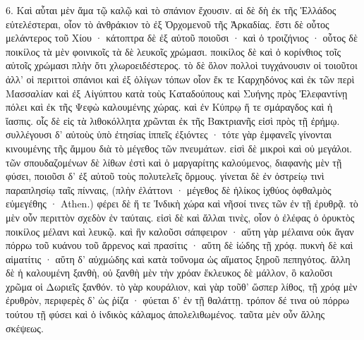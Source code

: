 \documentclass[a4paper, 11pt, oneside, polutonikogreek, german]{article}
\begin{document}
6. Καὶ αὗται μὲν ἅμα τῷ καλῷ καὶ τὸ σπάνιον ἔχουσιν. αἱ δὲ δὴ ἐκ τῆς Ἑλλάδος εὐτελέστεραι, οἷον τὸ ἀνθράκιον τὸ ἐξ Ὀρχομενοῦ τῆς Ἀρκαδίας. ἔστι δὲ οὗτος μελάντερος τοῦ Χίου · κάτοπτρα δὲ ἐξ αὐτοῦ ποιοῦσι · καὶ ὁ τροιζήνιος · οὗτος δὲ ποικίλος τὰ μὲν φοινικοῖς τὰ δὲ λευκοῖς χρώμασι. ποικίλος δὲ καὶ ὁ κορίνθιος τοῖς αὐτοῖς χρώμασι πλὴν ὅτι χλωροειδέστερος. τὸ δὲ ὅλον πολλοὶ τυγχάνουσιν οἱ τοιοῦτοι ἀλλ' οἱ περιττοὶ σπάνιοι καὶ ἐξ ὀλίγων τόπων οἷον ἔκ τε Καρχηδόνος καὶ ἐκ τῶν περὶ Μασσαλίαν καὶ ἐξ Αἰγύπτου κατὰ τοὺς Καταδούπους καὶ Συήνης πρὸς Ἐλεφαντίνῃ πόλει καὶ ἐκ τῆς Ψεφὼ καλουμένης χώρας. καὶ ἐν Κύπρῳ ἥ τε σμάραγδος καὶ ἡ ἴασπις. οἷς δὲ εἰς τὰ λιθοκόλλητα χρῶνται ἐκ τῆς Βακτριανῆς εἰσὶ πρὸς τῇ ἐρήμῳ. συλλέγουσι δ' αὐτοὺς ὑπὸ ἐτησίας ἱππεῖς ἐξιόντες · τότε γὰρ ἐμφανεῖς γίνονται κινουμένης τῆς ἄμμου διὰ τὸ μέγεθος τῶν πνευμάτων. εἰσὶ δὲ μικροὶ καὶ οὐ μεγάλοι. τῶν σπουδαζομένων δὲ λίθων ἐστὶ καὶ ὁ μαργαρίτης καλούμενος, διαφανὴς μὲν τῇ φύσει, ποιοῦσι δ' ἐξ αὐτοῦ τοὺς πολυτελεῖς ὅρμους. γίνεται δὲ ἐν ὀστρείῳ τινὶ παραπλησίῳ ταῖς πίνναις, (πλὴν ἐλάττονι · μέγεθος δὲ ἡλίκος ἰχθύος ὀφθαλμὸς εὐμεγέθης · Athen.) φέρει δὲ ἥ τε Ἰνδικὴ χώρα καὶ νῆσοί τινες τῶν ἐν τῇ ἐρυθρᾷ. τὸ μὲν οὖν περιττὸν σχεδὸν ἐν ταύταις. εἰσὶ δὲ καὶ ἄλλαι τινὲς, οἷον ὁ ἐλέφας ὁ ὀρυκτὸς ποικίλος μέλανι καὶ λευκῷ. καὶ ἣν καλοῦσι σάπφειρον · αὕτη γὰρ μέλαινα οὐκ ἄγαν πόρρω τοῦ κυάνου τοῦ ἄρρενος καὶ πρασίτις · αὕτη δὲ ἰώδης τῇ χρόᾳ. πυκνὴ δὲ καὶ αἱματίτις · αὕτη δ' αὐχμώδης καὶ κατὰ τοὔνομα ὡς αἵματος ξηροῦ πεπηγότος. ἄλλη δὲ ἡ καλουμένη ξανθὴ, οὐ ξανθὴ μὲν τὴν χρόαν ἔκλευκος δὲ μάλλον, ὃ καλοῦσι χρῶμα οἱ Δωριεῖς ξανθόν. τὸ γὰρ κουράλιον, καὶ γὰρ τοῦθ' ὥσπερ λίθος, τῇ χρόᾳ μὲν ἐρυθρὸν, περιφερὲς δ' ὡς ῥίζα · φύεται δ' ἐν τῇ θαλάττῃ. τρόπον δέ τινα οὐ πόρρω τούτου τῇ φύσει καὶ ὁ ἰνδικὸς κάλαμος ἀπολελιθωμένος. ταῦτα μὲν οὖν ἄλλης σκέψεως.
\end{document}
